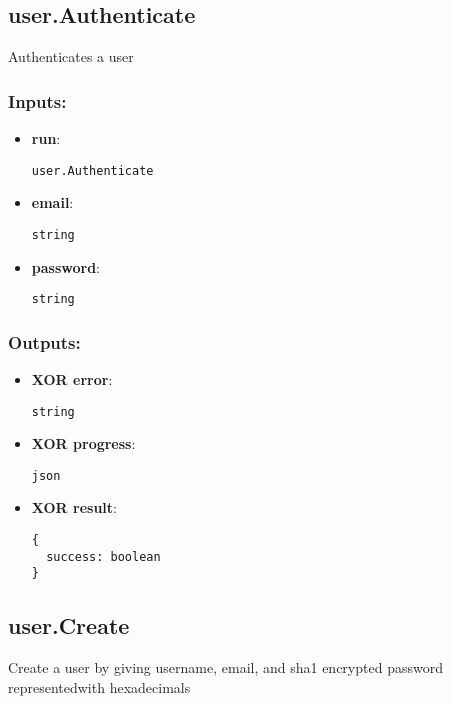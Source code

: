 \subsection{user.Authenticate}
\label{ch:builtinservices:user.Authenticate}
Authenticates a user
\subsubsection*{Inputs:}
\begin{itemize}
  \small
    \item \textbf{run}: 
\begin{lstlisting}
user.Authenticate
\end{lstlisting}
    \item \textbf{email}: 
\begin{lstlisting}
string
\end{lstlisting}
    \item \textbf{password}: 
\begin{lstlisting}
string
\end{lstlisting}
  \end{itemize}
\subsubsection*{Outputs:}
\begin{itemize}
  \small
    \item \textbf{XOR error}: 
\begin{lstlisting}
string
\end{lstlisting}
    \item \textbf{XOR progress}: 
\begin{lstlisting}
json
\end{lstlisting}
    \item \textbf{XOR result}: 
\begin{lstlisting}
{
  success: boolean
}
\end{lstlisting}
  \end{itemize}

\subsection{user.Create}
\label{ch:builtinservices:user.Create}
Create a user by giving username, email, and sha1 encrypted password representedwith hexadecimals
